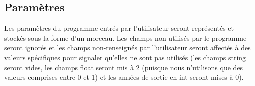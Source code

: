 \subsection{Paramètres}
\label{archi:structures:param}

Les paramètres du programme entrés par l'utilisateur seront représentés et 
stockés sous la forme d'un morceau. Les champs non-utilisés par le programme 
seront ignorés et les champs non-renseignés par l'utilisateur seront affectés 
à des valeurs spécifiques pour signaler qu'elles ne sont pas utilisés (les 
champs string seront vides, les champs float seront mis à 2 (puisque nous 
n'utilisons que des valeurs comprises entre 0 et 1) et les années de sortie 
en int seront mises à 0).